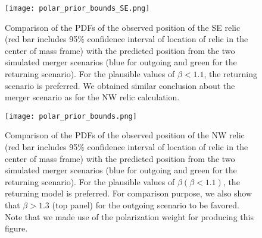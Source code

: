 \begin{figure}
\texttt{[image: polar\_prior\_bounds\_SE.png]}
	\caption{Comparison of the PDFs of the observed position of the SE relic (red bar
		includes 95\% confidence interval of location of relic in the center of
		mass frame) with the predicted position from the two simulated merger scenarios (blue for outgoing and green for the returning scenario). 
	For the plausible values of $\beta < 1.1$, the returning scenario is preferred. 
	We obtained similar conclusion about the merger scenario as for the NW
	relic calculation.
	\label{fig:positionprior_SE}}
\end{figure}

\begin{figure}
	\texttt{[image: polar\_prior\_bounds.png]}
	\caption{Comparison of the PDFs of the observed position of the NW relic (red bar
		includes 95\% confidence interval of location of relic in the center of
		mass frame) with the	predicted position from the two simulated merger scenarios (blue for outgoing and green for the returning scenario). 
	For the plausible values of $\beta (\beta < 1.1)$, the returning model is
	preferred. For comparison purpose, we also show that $\beta > 1.3$ (top
	panel) for the outgoing scenario to be favored.  
	Note that we made use of the polarization weight for producing this figure. 
	\label{fig: positionprior}}
\end{figure}
\clearpage
\bsp 
\label{lastpage} 

